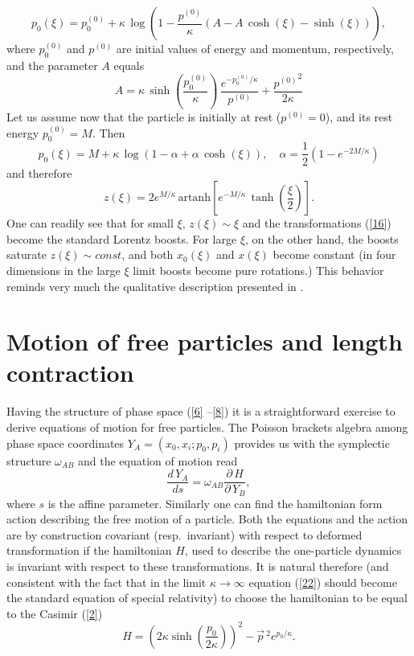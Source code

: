 \documentclass[a4paper,a4paper]{article}
\begin{document}
\begin{equation}\label{18}
p_0(\xi) = p^{(0)}_0+\kappa\, \log\left(1-\frac{p^{(0)}}{\kappa} (A-A\, {\cosh}(\xi)-{\sinh}(\xi))\right),
\end{equation}
where $p^{(0)}_0$ and $p^{(0)}$ are initial values of energy and momentum, respectively, and  the parameter $A$ equals
\begin{equation}\label{19}
  A=\kappa\, \sinh\left(\frac{p^{(0)}_0}{\kappa}\right)\, 
  \frac{e^{-p^{(0)}_0/\kappa}}{ p^{(0)}}+\frac{{p^{(0)}}^2}{2\kappa}
\end{equation}
Let us assume now that the particle is initially at rest ($p^{(0)}=0$), and its rest energy $p^{(0)}_0 =M$. Then
\begin{equation}\label{20}
 p_0(\xi) = M+\kappa\, \log\left(1-\alpha + \alpha\, {\cosh}(\xi)\right),\quad \alpha = \frac12 \left( 1 - e^{-2M/\kappa}\right)
\end{equation}
and therefore
\begin{equation}\label{21}
 z(\xi) = 2 e^{M/\kappa}\, \mbox{artanh}\left[e^{-M/\kappa}\, \tanh\left(\frac\xi2\right)\right].
\end{equation}
One can readily see that for small $\xi$, $z(\xi) \sim \xi$ and the transformations (\ref{16}) become the standard Lorentz boosts. For large $\xi$, on the other hand, the boosts saturate $z(\xi) \sim const$, and both $x_0(\xi)$ and $x(\xi)$ become constant (in four dimensions in the large $\xi$ limit boosts become pure rotations.)
 This behavior reminds very much the qualitative description presented in \cite{suss}.

\section{Motion of free particles and length contraction}

Having the structure of phase space (\ref{6} --\ref{8}) it is a straightforward exercise to derive equations of motion for free particles. The Poisson brackets algebra among phase space coordinates $Y_A = (x_0, x_i; p_0, p_i)$ provides us with the symplectic structure $\omega_{AB}$ and the equation of motion read
\begin{equation}\label{22}
 \frac{d\, Y_A}{d s} = \omega_{AB} \frac{\partial\, H}{\partial\,Y_B},
\end{equation}
where $s$ is the affine parameter. Similarly one can find the hamiltonian form action describing the free motion of a particle.
Both the equations and the action are by construction covariant (resp.~invariant) with respect to deformed transformation if the hamiltonian $H$, used to describe the one-particle dynamics is  invariant with respect to these transformations. It is natural therefore (and consistent with the fact that in the limit $\kappa\rightarrow\infty$ equation (\ref{22}) should become the standard equation of special relativity) to choose the hamiltonian to be equal to the Casimir (\ref{2})
$$ H = \left(2\kappa \sinh\left(\frac{p_0}{2\kappa}\right)\right)^2 - \vec{p}\,{}^2 e^{p_0/\kappa}.$$
\end{document}
